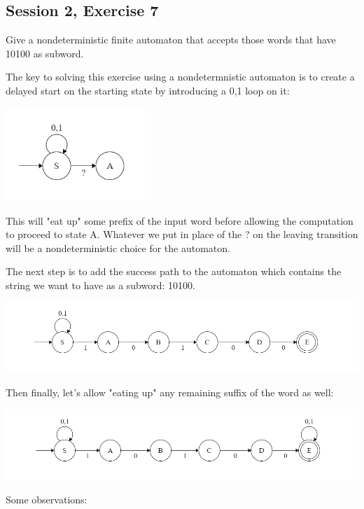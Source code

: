 \subsection{Session 2, Exercise 7}


Give a nondeterministic finite automaton that accepts those words that have 10100 as subword.


The key to solving this exercise using a nondetermnistic automaton is to create a delayed start on the starting state by introducing a 0,1 loop on it:

\includegraphics[width=200px]{02/wait_to_start.png}

This will "eat up" some prefix of the input word before allowing the computation to proceed to state A. Whatever we put in place of the ? on the leaving transition will be a nondeterministic choice for the automaton.

The next step is to add the success path to the automaton which contains the string we want to have as a subword: 10100.

\includegraphics[width=\linewidth]{02/success_path.png}

Then finally, let's allow "eating up" any remaining suffix of the word as well:

\includegraphics[width=\linewidth]{02/10100.png}

Some observations:

